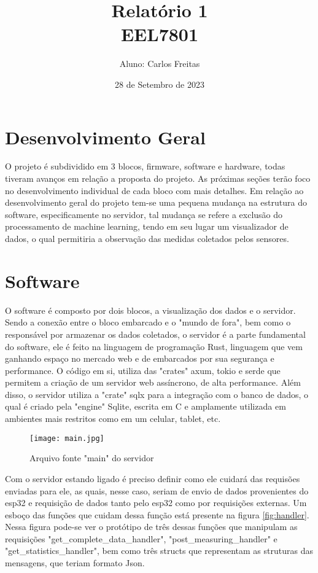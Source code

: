 \documentclass{article}
\title{Relatório 1\\ {\Large EEL7801}}
\author{Aluno: Carlos Freitas}
\date{28 de Setembro de 2023}
\begin{document}
\maketitle

\section*{Desenvolvimento Geral}

O projeto é subdividido em 3 blocos, firmware, software e hardware, todas tiveram 
avanços em relação a proposta do projeto. As próximas seções terão foco no desenvolvimento
individual de cada bloco com mais detalhes. Em relação ao desenvolvimento geral do projeto
tem-se uma pequena mudança na estrutura do software, especificamente no servidor, tal mudança
se refere a exclusão do processamento de machine learning, tendo em seu lugar
um visualizador de dados, o qual permitiria a observação das medidas
coletados pelos sensores.

\section{Software}

O software é composto por dois blocos, a visualização dos dados e o servidor. 
Sendo a conexão entre o bloco embarcado e o "mundo de fora", bem como o responsável 
por armazenar os dados coletados, o servidor é a parte fundamental do software,
ele é feito na linguagem de programação Rust, linguagem que vem ganhando espaço 
no mercado web e de embarcados por sua segurança e performance. O código em si, utiliza
das "crates" axum, tokio e serde que permitem a criação de um servidor web 
assíncrono, de alta performance.
Além disso, o servidor utiliza a "crate" sqlx para a integração com o banco de dados, 
o qual é criado pela "engine" Sqlite, escrita em C e amplamente utilizada em ambientes
mais restritos como em um celular, tablet, etc.

\begin{figure}[ht]
	\centering
	\texttt{[image: main.jpg]}
	\caption{Arquivo fonte "main" do servidor}
	\label{fig:main}
\end{figure}

Com o servidor estando ligado é preciso definir como ele cuidará das requisões 
enviadas para ele, as quais, nesse caso, seriam de envio de dados provenientes 
do esp32 e requisição de dados tanto pelo esp32 como por requisições externas.
Um esboço das funções que cuidam dessa função está presente na figura \ref{fig:handler}.
Nessa figura pode-se ver o protótipo de três dessas funções que manipulam as requisições
"get\_complete\_data\_handler", "post\_measuring\_handler"
e "get\_statistics\_handler", bem como três structs que representam as struturas das mensagens,
que teriam formato Json.
\end{document}
